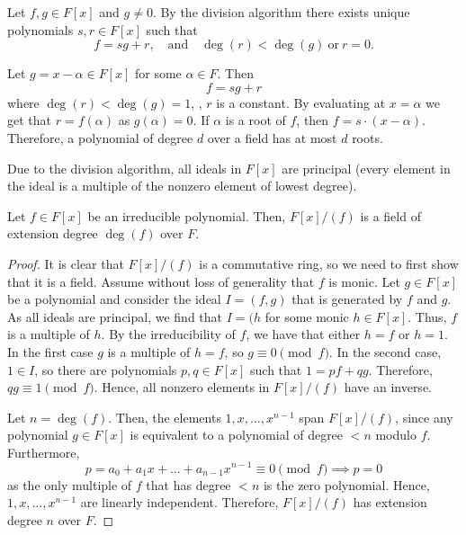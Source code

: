 \documentclass[../main.tex]{subfiles}
\begin{document}
Let $f, g \in F[x]$ and $g \neq 0$. By the division algorithm there exists unique polynomials $s, r \in F[x]$ such that
\begin{equation*}
    f = sg + r, \quad \text{and} \quad \deg(r) < \deg(g)~\text{or}~r = 0.
\end{equation*}

\begin{example}
Let $g = x - \alpha \in F[x]$ for some $\alpha \in F$. Then
\begin{equation*}
    f = sg + r
\end{equation*}
where $\deg(r) < \deg(g) = 1$, \ie, $r$ is a constant. By evaluating at $x = \alpha$ we get that $r = f(\alpha)$ as $g(\alpha) = 0$. If $\alpha$ is a root of $f$, then $f = s \cdot (x - \alpha)$. Therefore, a polynomial of degree $d$ over a field has at most $d$ roots.
\end{example}

Due to the division algorithm, all ideals in $F[x]$ are principal (every element in the ideal is a multiple of the nonzero element of lowest degree).

\begin{lemma}\label{lem:quotient_by_irreducible_polynomial}
Let $f \in F[x]$ be an irreducible polynomial. Then, $F[x] / (f)$ is a field of extension degree $\deg(f)$ over $F$.
\end{lemma}

\begin{proof}
It is clear that $F[x] / (f)$ is a commutative ring, so we need to first show that it is a field. Assume without loss of generality that $f$ is monic. Let $g \in F[x]$ be a polynomial and consider the ideal $I = (f, g)$ that is generated by $f$ and $g$. As all ideals are principal, we find that $I = (h$ for some monic $h \in F[x]$. Thus, $f$ is a multiple of $h$. By the irreducibility of $f$, we have that either $h = f$ or $h = 1$. In the first case $g$ is a multiple of $h = f$, so $g \equiv 0 \pmod f$. In the second case, $1 \in I$, so there are polynomials $p, q \in F[x]$ such that $1 = pf + qg$. Therefore, $qg \equiv 1 \pmod f$. Hence, all nonzero elements in $F[x] / (f)$ have an inverse.

Let $n = \deg(f)$. Then, the elements $1, x, \dots, x^{n-1}$ span $F[x] / (f)$, since any polynomial $g \in F[x]$ is equivalent to a polynomial of degree $< n$ modulo $f$. Furthermore,
\begin{equation*}
    p = a_0 + a_1x + \dots + a_{n-1}x^{n-1} \equiv 0 \pmod f \implies p = 0
\end{equation*}
as the only multiple of $f$ that has degree $< n$ is the zero polynomial. Hence, $1, x, \dots, x^{n-1}$ are linearly independent. Therefore, $F[x] / (f)$ has extension degree $n$ over $F$.
\end{proof}
\end{document}
